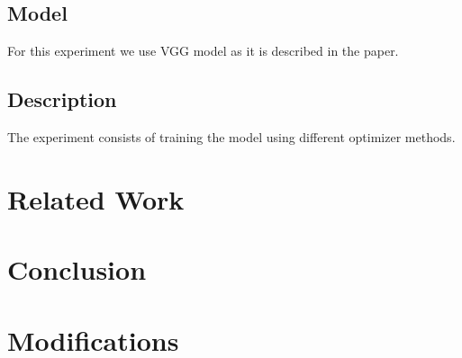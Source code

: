 \documentclass[sigconf]{acmart}
\begin{document}
\subsection{Model}
For this experiment we use VGG model as it is described in the paper.
\subsection{Description}
The experiment consists of training the model using different optimizer methods.
\section{Related Work}

\section{Conclusion}

\section{Modifications}










\appendix
\end{document}
